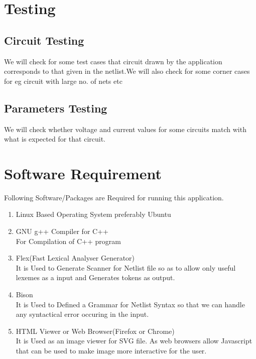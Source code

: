 \documentclass[12pt]{extarticle}
\begin{document}
\section{Testing}

\subsection{Circuit Testing} We will check for some test cases that circuit drawn by the application corresponds to that given in the netlist.We will also check for some corner cases for eg circuit with large no. of nets etc
\subsection{Parameters Testing}We will check whether voltage and current values for some circuits match with what is expected for that circuit.
\section{Software Requirement}
Following Software/Packages are Required for running this application.
\begin{enumerate}
\item Linux Based Operating System preferably Ubuntu
\item GNU g++ Compiler for C++\\
For Compilation of C++ program
\item Flex(Fast Lexical Analyser Generator)\\
It is Used to Generate Scanner for Netlist file so as to allow only useful lexemes as a input and Generates tokens as output.
\item Bison\\
It is Used to Defined a Grammar for Netlist Syntax so that we can handle any syntactical error occuring in the input.
\item HTML Viewer or Web Browser(Firefox or Chrome)\\
It is Used as an image viewer for SVG file. As web browsers allow Javascript that can be used to make image more interactive for the user.
\end{enumerate}
\end{document}
